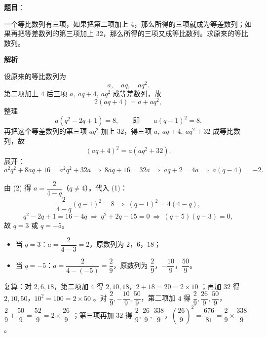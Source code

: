 \begin{answer}

\textbf{题目}：

一个等比数列有三项，如果把第二项加上 4，那么所得的三项就成为等差数列；如果再把等差数列的第三项加上 32，那么所得的三项又成等比数列。求原来的等比数列。

\textbf{解析}

设原来的等比数列为
\nopagebreak[4]
\[
a,\quad aq,\quad aq^2.
\]
第二项加上 $4$ 后三项 $a,\ aq+4,\ aq^2$ 成等差数列，故
\nopagebreak[4]
\[
2(aq+4)=a+aq^2,
\]
整理
\nopagebreak[4]
\[
a\left(q^2-2q+1\right)=8,\qquad\text{即}\qquad a(q-1)^2=8. \tag{1}
\]
再把这个等差数列的第三项 $aq^2$ 加上 $32$，得三项 $a,\ aq+4,\ aq^2+32$ 成等比数列，故
\nopagebreak[4]
\[
(aq+4)^2=a\left(aq^2+32\right).
\]
展开：
\nopagebreak[4]
\[
a^2q^2+8aq+16=a^2q^2+32a\ \Longrightarrow\ 8aq+16=32a\ \Longrightarrow\ aq+2=4a\ \Longrightarrow\ a(q-4)=-2. \tag{2}
\]

由 (2) 得 $a=\dfrac{2}{4-q}$（$q\ne4$）。代入 (1)：
\nopagebreak[4]
\[
\frac{2}{4-q}(q-1)^2=8\ \Longrightarrow\ (q-1)^2=4(4-q),
\]
\nopagebreak[4]
\[
q^2-2q+1=16-4q\ \Longrightarrow\ q^2+2q-15=0\ \Longrightarrow\ (q+5)(q-3)=0,
\]
故 $q=3$ 或 $q=-5$。

\begin{itemize}
\item 当 $q=3$：$a=\dfrac{2}{4-3}=2$，原数列为 $2$，$6$，$18$；
\item 当 $q=-5$：$a=\dfrac{2}{4-(-5)}=\dfrac29$，原数列为 $\dfrac29$，$-\dfrac{10}9$，$\dfrac{50}9$。
\end{itemize}

复算：对 $2,6,18$，第二项加 $4$ 得 $2,10,18$，$2+18=20=2\times10$ ；再加 $32$ 得 $2,10,50$，$10^2=100=2\times50$ 。对 $\dfrac29,-\dfrac{10}9,\dfrac{50}9$，第二项加 $4$ 得 $\dfrac29,\dfrac{26}9,\dfrac{50}9$，$\dfrac29+\dfrac{50}9=\dfrac{52}9=2\times\dfrac{26}9$ ；第三项再加 $32$ 得 $\dfrac29,\dfrac{26}9,\dfrac{338}9$，$\left(\dfrac{26}9\right)^2=\dfrac{676}{81}=\dfrac29\times\dfrac{338}9$ 。


\end{answer}
